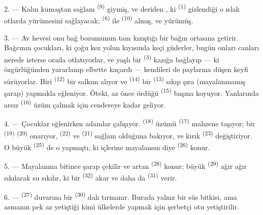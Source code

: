2. --- Kalın kumaştan sağlam  \textsuperscript{(9)}
giymiş, ve deriden , ki 
\textsuperscript{(1)} gizlendiği o ıslak otlarda yürümesini sağlayacak;
 \textsuperscript{(6)} ile 
\textsuperscript{(10)} almış, ve yürümüş.

3. --- Av hevesi onu bağ bozumunun tam kızıştığı bir bağın ortasına getirir.
Bağcının çocukları, ki çoğu kez yolun kıyısında keçi güderler, bugün onları
canları nerede isterse orada otlatıyorlar, ve yaşlı bir 
\textsuperscript{(3)} kazığa bağlayıp --- ki özgürlüğünden yararlanıp elbette
kaçardı --- kendileri de paylarına düşen keyfi sürüyorlar. Biri
 \textsuperscript{(12)} bir salkım alıyor ve
 \textsuperscript{(14)} bir  \textsuperscript{(13)}
sıkıp şıra (mayalanmamış şarap) yapmakla eğleniyor. Öteki, az önce ördüğü
 \textsuperscript{(15)} başına koyuyor. Yanlarında arsız
 \textsuperscript{(16)} üzüm çalmak için cendereye kadar
geliyor.

4. --- Çocuklar eğlenirken adamlar çalışıyor. 
\textsuperscript{(18)} üzümü  \textsuperscript{(17)}
mahzene taşıyor; bir  \textsuperscript{(19)}
 \textsuperscript{(20)} onarıyor, 
\textsuperscript{(22)} ve  \textsuperscript{(21)} sağlam
olduğuna bakıyor, ve kırık  \textsuperscript{(23)}
değiştiriyor. O büyük  \textsuperscript{(25)} de o yapmıştı, ki
içlerine mayalansın diye  \textsuperscript{(26)} konur.

5. --- Mayalanma bitince şarap çekilir ve artan 
\textsuperscript{(28)} konur; büyük  \textsuperscript{(29)} ağır
ağır sıkılarak su sıkılır, ki bir  \textsuperscript{(32)} akar
ve daha da  \textsuperscript{(31)} verir.

\VUsaut{6.0mm}
\VUsaut{3.4mm}

6. ---  \textsuperscript{(27)} duvarına bir  \textsuperscript{(30)} dalı tırmanır. Burada yalnız bir süs bitkisi,
ama asmanın pek az yetiştiği kimi ülkelerde  yapmak için şerbetçi
otu yetiştirilir.

